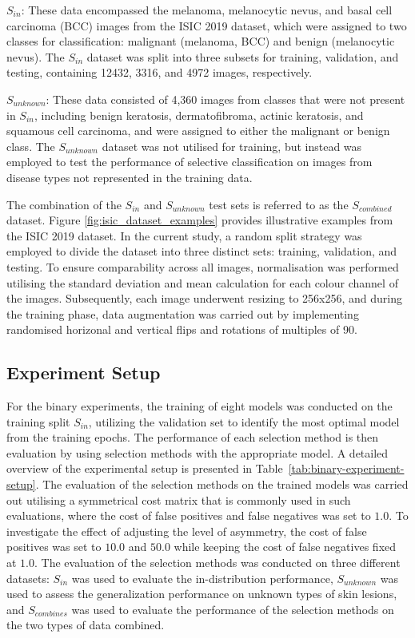$S_{in}$: These data encompassed the melanoma, melanocytic nevus, and basal cell carcinoma (BCC) images from the ISIC 2019 dataset, which were assigned to two classes for classification: malignant (melanoma, BCC) and benign (melanocytic nevus). The $S_{in}$ dataset was split into three subsets for training, validation, and testing, containing 12432, 3316, and 4972 images, respectively.

$S_{unknown}$: These data consisted of 4,360 images from classes that were not present in $S_{in}$, including benign keratosis, dermatofibroma, actinic keratosis, and squamous cell carcinoma, and were assigned to either the malignant or benign class. The $S_{unknown}$ dataset was not utilised for training, but instead was employed to test the performance of selective classification on images from disease types not represented in the training data.

The combination of the $S_{in}$ and $S_{unknown}$ test sets is referred to as the $S_{combined}$ dataset. Figure \ref{fig:isic_dataset_examples} provides illustrative examples from the ISIC 2019 dataset. In the current study, a random split strategy was employed to divide the dataset into three distinct sets: training, validation, and testing. To ensure comparability across all images, normalisation was performed utilising the standard deviation and mean calculation for each colour channel of the images. Subsequently, each image underwent resizing to 256x256, and during the training phase, data augmentation was carried out by implementing randomised horizonal and vertical flips and rotations of multiples of 90\textdegree.

\subsection{Experiment Setup}
For the binary experiments, the training of eight models was conducted on the training split $S_{in}$, utilizing the validation set to identify the most optimal model from the training epochs. The performance of each selection method is then evaluation by using selection methods with the appropriate model. A detailed overview of the experimental setup is presented in Table~\ref{tab:binary-experiment-setup}. The evaluation of the selection methods on the trained models was carried out utilising a symmetrical cost matrix that is commonly used in such evaluations, where the cost of false positives and false negatives was set to $1.0$. To investigate the effect of adjusting the level of asymmetry, the cost of false positives was set to $10.0$ and $50.0$ while keeping the cost of false negatives fixed at $1.0$. The evaluation of the selection methods was conducted on three different datasets: $S_{in}$ was used to evaluate the in-distribution performance, $S_{unknown}$ was used to assess the generalization performance on unknown types of skin lesions, and $S_{combines}$ was used to evaluate the performance of the selection methods on the two types of data combined.

